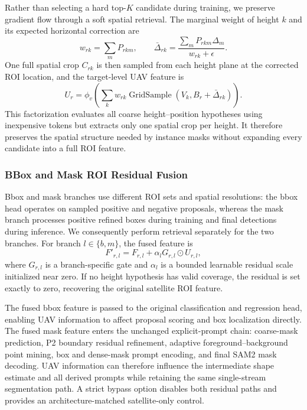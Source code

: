 \documentclass[letterpaper,journal]{IEEEtran}
\begin{document}
Rather than selecting a hard top-$K$ candidate during training, we preserve gradient flow through a soft spatial retrieval. The marginal weight of height $k$ and its expected horizontal correction are
\begin{equation}
w_{rk}=\sum_mP_{rkm}, \qquad
\bar{\Delta}_{rk}=
\frac{\sum_mP_{rkm}\Delta_m}{w_{rk}+\epsilon}.
\end{equation}
One full spatial crop $C_{rk}$ is then sampled from each height plane at the corrected ROI location, and the target-level UAV feature is
\begin{equation}
U_r=\phi_v\!\left(\sum_k w_{rk}
\operatorname{GridSample}(V_k,B_r+\bar{\Delta}_{rk})\right).
\label{eq:uav_roi}
\end{equation}
This factorization evaluates all coarse height--position hypotheses using inexpensive tokens but extracts only one spatial crop per height. It therefore preserves the spatial structure needed by instance masks without expanding every candidate into a full ROI feature.

\subsubsection{BBox and Mask ROI Residual Fusion}
Bbox and mask branches use different ROI sets and spatial resolutions: the bbox head operates on sampled positive and negative proposals, whereas the mask branch processes positive refined boxes during training and final detections during inference. We consequently perform retrieval separately for the two branches. For branch $l\in\{b,m\}$, the fused feature is
\begin{equation}
F'_{r,l}=F_{r,l}+\alpha_lG_{r,l}\odot U_{r,l},
\label{eq:dual_residual}
\end{equation}
where $G_{r,l}$ is a branch-specific gate and $\alpha_l$ is a bounded learnable residual scale initialized near zero. If no height hypothesis has valid coverage, the residual is set exactly to zero, recovering the original satellite ROI feature.

The fused bbox feature is passed to the original classification and regression head, enabling UAV information to affect proposal scoring and box localization directly. The fused mask feature enters the unchanged explicit-prompt chain: coarse-mask prediction, P2 boundary residual refinement, adaptive foreground--background point mining, box and dense-mask prompt encoding, and final SAM2 mask decoding. UAV information can therefore influence the intermediate shape estimate and all derived prompts while retaining the same single-stream segmentation path. A strict bypass option disables both residual paths and provides an architecture-matched satellite-only control.
\end{document}
